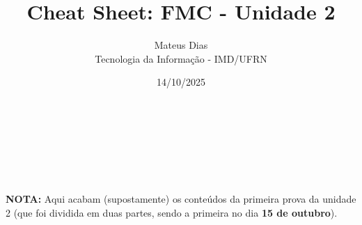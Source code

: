 \documentclass[a4paper,12pt]{article}
\title{\textbf{Cheat Sheet: FMC - Unidade 2}}
\author{Mateus Dias \\ Tecnologia da Informação - IMD/UFRN}
\date{14/10/2025}
\begin{document}
\maketitle
\vspace{12pt}


\vspace{6pt}\\


\vspace{-5pt}\\


\vspace{6pt}\\








\vspace{6pt}\\











\vspace{14pt}
\hrulefill
\vspace{20pt}

\noindent
\colorbox{yellow!30}{
    \begin{minipage}{\linewidth-2\fboxsep-2\fboxrule}
        \textbf{NOTA:}
        Aqui acabam (supostamente) os conteúdos da primeira prova da unidade 2 (que foi dividida em duas partes, sendo a primeira no dia \textbf{15 de outubro}).
    \end{minipage}
}
\end{document}
